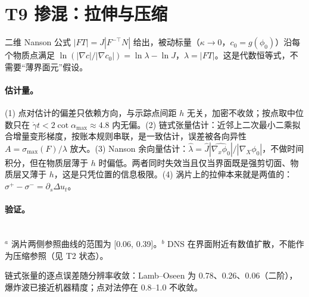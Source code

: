 \section{T9 掺混：拉伸与压缩}

\begin{proposition}[梯度增长的精确分解]
二维 Nanson 公式 $|FT|=J|F^{-\top}N|$ 给出，被动标量（$\kappa\to0$，$c_0=g(\phi_0)$）沿每个物质点满足
$\ln(|\nabla c|/|\nabla c_0|)=\ln\lambda-\ln J$，$\lambda=|FT|$。这是代数恒等式，不需要“薄界面元”假设。
\end{proposition}

\paragraph{估计量。}(1) 点对估计的偏差只依赖方向，与示踪点间距 $h$ 无关，加密不收敛；按点取中位数只在 $\dot\gamma t<2\cot\alpha_{\max}\approx4.8$ 内无偏。(2) 链式张量估计：近邻上二次最小二乘拟合增量变形梯度，按账本规则串联，是一致估计，误差被各向异性 $A=\sigma_{\max}(F)/\lambda$ 放大。(3) Nanson 余向量估计：$\hat\lambda=\hat J|\widehat{\nabla_x\phi_0}|/|\nabla_X\phi_0|$，不做时间积分，但在物质层薄于 $h$ 时偏低。两者同时失效当且仅当界面既是强剪切面、物质层又薄于 $h$，这是只凭位置的信息极限。(4) 涡片上的拉伸本来就是两值的：$\sigma^+-\sigma^-=\partial_s\Delta u_t$。

\paragraph{验证。}
\begin{center}\small
{}\\[0.2em]{\footnotesize $^a$ 涡片两侧参照曲线的范围为 [0.06, 0.39]。\quad $^b$ DNS 在界面附近有数值扩散，不能作为压缩参照（见 T2 状态）。}\end{center}
链式张量的逐点误差随分辨率收敛：Lamb–Oseen 为 0.78、0.26、0.06（二阶），爆炸波已接近机器精度；点对法停在 0.8–1.0 不收敛。

